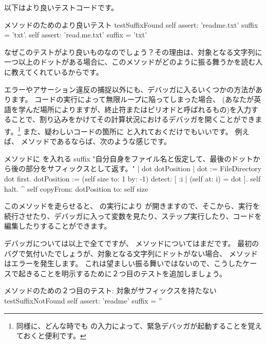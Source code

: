 \documentclass[a4paper,10pt,twoside]{book}
\begin{document}
以下はより良いテストコードです。

\begin{method}[testSuffix2]{ メソッドのためのより良いテスト}
testSuffixFound
self assert: 'readme.txt' suffix = 'txt'.
self assert: 'read.me.txt' suffix = 'txt'
\end{method}
\noindent
なぜこのテストがより良いものなのでしょう？その理由は、対象となる文字列に一つ以上のドットがある場合に、このメソッドがどのように振る舞うかを読む人に教えてくれているからです。

エラーやアサーション違反の捕捉以外にも、デバッガに入るいくつかの方法があります。
コードの実行によって無限ループに陥ってしまった場合、  (あなたが英語を学んだ場所によりますが、終止符またはピリオドと呼ばれるもの)を入力することで、割り込みをかけてその計算状況におけるデバッガを開くことができます。\footnote{同様に、どんな時でも  の入力によって、緊急デバッガが起動することを覚えておくと便利です。}
また、疑わしいコードの箇所に  と入れておくだけでもいいです。
例えば、 メソッドであるならば、次のような感じです。

\needspace{11ex}
\begin{method}[suffix]{ メソッドに  を入れる}
suffix
"自分自身をファイル名と仮定して、最後のドットから後の部分をサフィックスとして返す。"
| dot dotPosition |
dot := FileDirectory dot first.
dotPosition := (self size to: 1 by: -1) detect: [ :i | (self at: i) = dot ].
self halt.
^ self copyFrom: dotPosition to: self size
\end{method}

このメソッドを走らせると、  の実行により  が開きますので、そこから、実行を続行させたり、デバッガに入って変数を見たり、ステップ実行したり、コードを編集したりすることができます。

デバッガについては以上で全てですが、  メソッドについてはまだです。
最初のバグで気付いたでしょうが、対象となる文字列にドットがない場合、 メソッドはエラーを発生します。
これは望ましい振る舞いではないので、こうしたケースで起きることを明示するために２つ目のテストを追加しましょう。

\begin{method}[testNoSuffix]{ メソッドのための２つ目のテスト: 対象がサフィックスを持たない}
testSuffixNotFound
self assert: 'readme' suffix = ''
\end{method}

\end{document}
